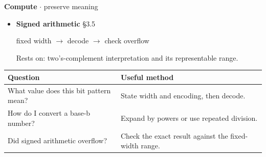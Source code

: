 \documentclass[11pt]{article}
\begin{document}
\begin{keepsection}
\textbf{Compute} \ensuremath{\cdot} preserve meaning

\begin{itemize}
\item {}
\textbf{Signed arithmetic} \hfill{\small\color{FAUblue}§3.5}

fixed width \ensuremath{\to} decode \ensuremath{\to} check overflow

Rests on: two’s-complement interpretation and its representable range.
\end{itemize}

\begin{center}\small\begin{tabularx}{\linewidth}{>{\raggedright\arraybackslash}X>{\raggedright\arraybackslash}X}\toprule
\textbf{Question} & \textbf{Useful method} \\ \midrule
What value does this bit pattern mean? & State width and encoding, then decode. \\
How do I convert a base-b number? & Expand by powers or use repeated division. \\
Did signed arithmetic overflow? & Check the exact result against the fixed-width range. \\
\bottomrule\end{tabularx}\end{center}
\end{keepsection}
\end{document}
